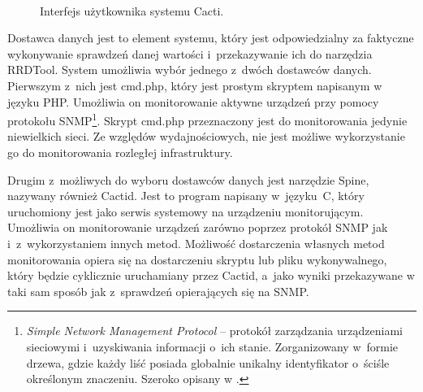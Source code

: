 \begin{figure}[h]
\label{fig:CactiInterface}
\caption{Interfejs użytkownika systemu Cacti.}
\begin{center}
\\[0.1cm]
\end{center}
\end{figure}


Dostawca danych jest to element systemu, który jest odpowiedzialny za
faktyczne wykonywanie sprawdzeń danej wartości i~przekazywanie ich do
narzędzia RRDTool. System umożliwia wybór jednego z~dwóch dostawców
danych. Pierwszym z~nich jest cmd.php, który jest prostym skryptem
napisanym w języku PHP. Umożliwia on monitorowanie aktywne urządzeń
przy pomocy protokołu SNMP\footnote{ {\em Simple Network Management
    Protocol} -- protokół zarządzania urządzeniami sieciowymi
  i~uzyskiwania informacji o~ich stanie. Zorganizowany w~formie
  drzewa, gdzie każdy liść posiada globalnie unikalny identyfikator
  o~ściśle określonym znaczeniu. Szeroko opisany w \cite{www:SNMP}.}. Skrypt
cmd.php przeznaczony jest do monitorowania jedynie niewielkich
sieci. Ze względów wydajnościowych, nie jest możliwe wykorzystanie go
do monitorowania rozległej infrastruktury.

Drugim z~możliwych do wyboru dostawców danych jest narzędzie Spine,
nazywany również Cactid. Jest to program napisany w~języku~C, który
uruchomiony jest jako serwis systemowy na urządzeniu
monitorującym. Umożliwia on monitorowanie urządzeń zarówno poprzez
protokół SNMP jak i~z~wykorzystaniem innych metod. Możliwość
dostarczenia własnych metod monitorowania opiera się na dostarczeniu
skryptu lub pliku wykonywalnego, który będzie cyklicznie uruchamiany
przez Cactid, a~jako wyniki przekazywane w taki sam sposób jak
z~sprawdzeń opierających się na SNMP.

